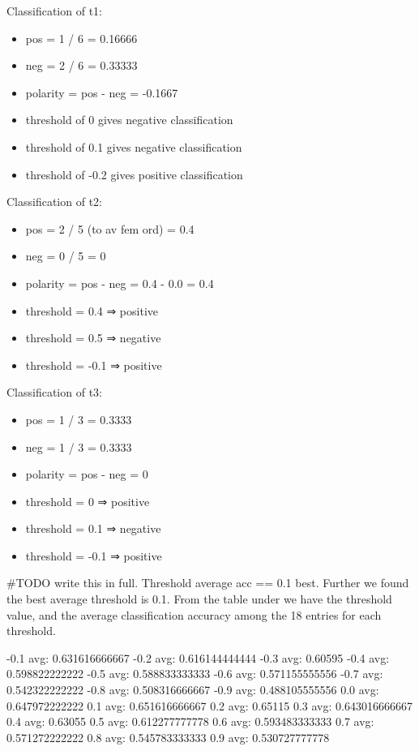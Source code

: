 Classification of t1:
\begin{itemize}
    \item pos = 1 / 6 = 0.16666
    \item neg = 2 / 6 = 0.33333
    \item polarity = pos - neg = -0.1667
    \item threshold of 0 gives negative classification
    \item threshold of 0.1 gives negative classification
    \item threshold of -0.2 gives positive classification
\end{itemize}

Classification of t2:
\begin{itemize}
    \item pos = 2 / 5 (to av fem ord) = 0.4
    \item neg = 0 / 5 = 0
    \item polarity = pos - neg = 0.4 - 0.0 = 0.4
    \item threshold = 0.4 ⇒ positive
    \item threshold = 0.5 ⇒ negative
    \item threshold = -0.1 ⇒ positive
\end{itemize}

Classification of t3:
\begin{itemize}
    \item pos = 1 / 3 = 0.3333
    \item neg = 1 / 3 = 0.3333
    \item polarity = pos - neg = 0
    \item threshold = 0 ⇒ positive
    \item threshold = 0.1 ⇒ negative
    \item threshold = -0.1 ⇒ positive
\end{itemize}

#TODO write this in full. Threshold average acc == 0.1 best. 
Further we found the best average threshold is 0.1.
From the table under we have the threshold value, and the average
classification accuracy among the 18 entries for each threshold. 

-0.1 avg: 0.631616666667
-0.2 avg: 0.616144444444
-0.3 avg: 0.60595
-0.4 avg: 0.598822222222
-0.5 avg: 0.588833333333
-0.6 avg: 0.571155555556
-0.7 avg: 0.542322222222
-0.8 avg: 0.508316666667
-0.9 avg: 0.488105555556
0.0 avg: 0.647972222222
0.1 avg: 0.651616666667
0.2 avg: 0.65115
0.3 avg: 0.643016666667
0.4 avg: 0.63055
0.5 avg: 0.612277777778
0.6 avg: 0.593483333333
0.7 avg: 0.571272222222
0.8 avg: 0.545783333333
0.9 avg: 0.530727777778

